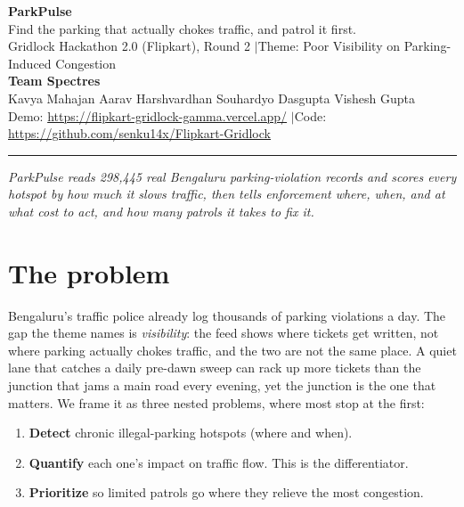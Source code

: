 \documentclass[11pt,a4paper]{article}
\begin{document}
\begin{center}
  {\Huge\bfseries\color{accent} ParkPulse}\\[5pt]
  {\large Find the parking that actually chokes traffic, and patrol it first.}\\[9pt]
  {\small Gridlock Hackathon 2.0 (Flipkart), Round 2 \quad$\vert$\quad Theme: Poor Visibility on Parking-Induced Congestion}\\[10pt]
  {\bfseries\color{ink} Team Spectres}\\[2pt]
  {\small Kavya Mahajan \quad Aarav Harshvardhan \quad Souhardyo Dasgupta \quad Vishesh Gupta}\\[8pt]
  {\small Demo: \url{https://flipkart-gridlock-gamma.vercel.app/} \quad$\vert$\quad Code: \url{https://github.com/senku14x/Flipkart-Gridlock}}
\end{center}
\vspace{2pt}\hrule\vspace{8pt}

{\itshape\color{grey} ParkPulse reads 298{,}445 real Bengaluru parking-violation records and scores every hotspot by how much it slows traffic, then tells enforcement where, when, and at what cost to act, and how many patrols it takes to fix it.}

\section{The problem}
Bengaluru's traffic police already log thousands of parking violations a day. The gap the theme names is \emph{visibility}: the feed shows where tickets get written, not where parking actually chokes traffic, and the two are not the same place. A quiet lane that catches a daily pre-dawn sweep can rack up more tickets than the junction that jams a main road every evening, yet the junction is the one that matters. We frame it as three nested problems, where most stop at the first:

\begin{enumerate}[label=\textbf{\arabic*.}]
  \item \textbf{Detect} chronic illegal-parking hotspots (where and when).
  \item \textbf{Quantify} each one's impact on traffic flow. This is the differentiator.
  \item \textbf{Prioritize} so limited patrols go where they relieve the most congestion.
\end{enumerate}
\end{document}
